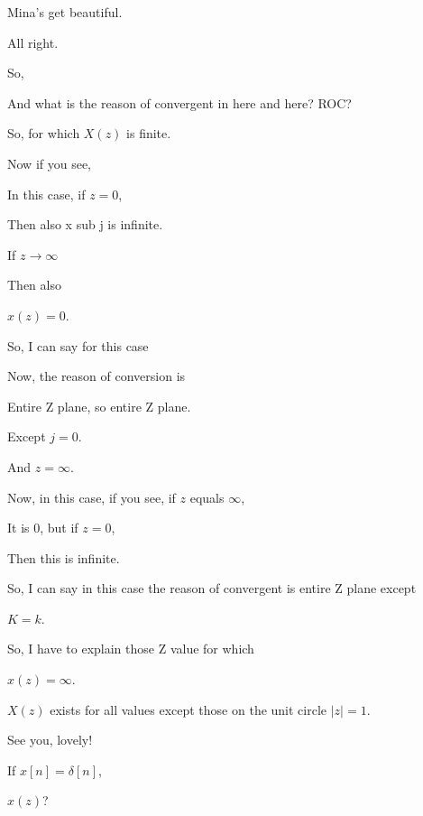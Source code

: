 \documentclass{article}
\begin{document}
Mina's get beautiful.

All right.



So,



And what is the reason of convergent in here and here? ROC?

So, for which $X(z)$ is finite.

Now if you see,

In this case, if $z = 0$,

Then also x sub j is infinite.

If $z \to \infty$

Then also

$x(z) = 0$.

So, I can say for this case

Now, the reason of conversion is

Entire Z plane, so entire Z plane.

Except $j = 0$.

And $z = \infty$.

Now, in this case, if you see, if $z$ equals $\infty$,

It is 0, but if $z = 0$,

Then this is infinite.

So, I can say in this case the reason of convergent is entire Z plane except

$K = k$.





So, I have to explain those Z value for which

$x(z) = \infty$.

$X(z)$ exists for all values except those on the unit circle $|z|=1$.



See you, lovely!

If $x[n] = \delta[n]$,

$x(z)$?
\end{document}
